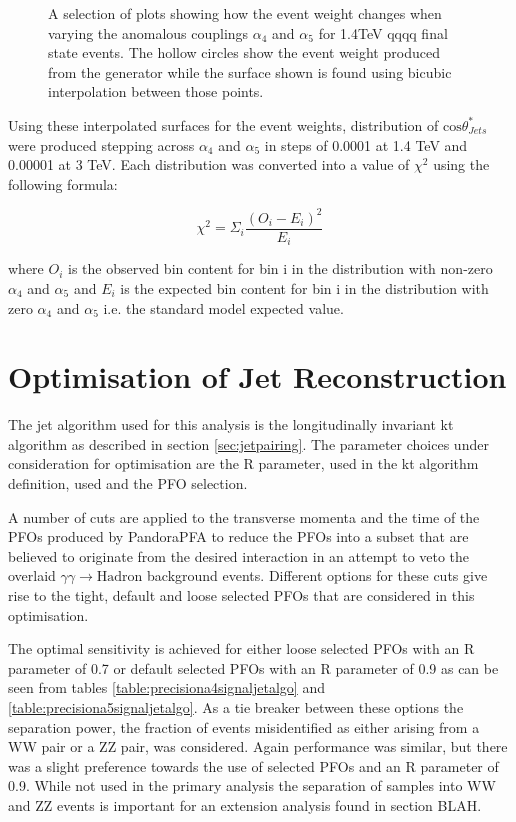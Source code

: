 \begin{figure}
\caption[Event weights from Whizard for 1.4TeV \nu{\nu}qqqq final state events with interpolated surface.]{A selection of plots showing how the event weight changes when varying the anomalous couplings $\alpha_{4}$ and $\alpha_{5}$ for 1.4TeV \nu{\nu}qqqq final state events.  The hollow circles show the event weight produced from the generator while the surface shown is found using bicubic interpolation between those points.}
\label{fig:eventweights1400interpolated}
\end{figure}

Using these interpolated surfaces for the event weights, distribution of $\text{cos}\theta^{*}_{Jets}$ were produced stepping across $\alpha_{4}$ and $\alpha_{5}$ in steps of 0.0001 at 1.4 TeV and 0.00001 at 3 TeV.  Each distribution was converted into a value of $\chi^{2}$ using the following formula:

\begin{equation}
\chi^{2} = \Sigma_{i} \frac{(O_{i} - E_{i})^{2}}{E_{i}}
\end{equation}

where $O_{i}$ is the observed bin content for bin i in the distribution with non-zero $\alpha_{4}$ and $\alpha_{5}$ and $E_{i}$ is the expected bin content for bin i in the distribution with zero $\alpha_{4}$ and $\alpha_{5}$ i.e. the standard model expected value.

\section{Optimisation of Jet Reconstruction} \label{sec:optimisationjetalgo}

The jet algorithm used for this analysis is the longitudinally invariant kt algorithm as described in section \ref{sec:jetpairing}.  The parameter choices under consideration for optimisation are the R parameter, used in the kt algorithm definition, used and the PFO selection.  

A number of cuts \cite{arXiv:1209.4039} are applied to the transverse momenta and the time of the PFOs produced by PandoraPFA to reduce the PFOs into a subset that are believed to originate from the desired interaction in an attempt to veto the overlaid $\gamma\gamma \rightarrow \text{Hadron}$ background events.  Different options for these cuts  give rise to the tight, default and loose selected PFOs that are considered in this optimisation.  

The optimal sensitivity is achieved for either loose selected PFOs with an R parameter of 0.7 or default selected PFOs with an R parameter of 0.9 as can be seen from tables \ref{table:precisiona4signaljetalgo} and \ref{table:precisiona5signaljetalgo}.  As a tie breaker between these options the separation power, the fraction of events misidentified as either arising from a WW pair or a ZZ pair, was considered.  Again performance was similar, but there was a slight preference towards the use of selected PFOs and an R parameter of 0.9.  While not used in the primary analysis the separation of samples into WW and ZZ events is important for an extension analysis found in section BLAH.

